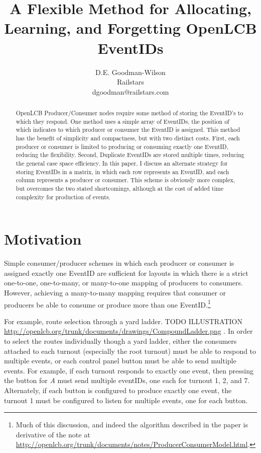 \documentclass[11pt]{article}
\title{A Flexible Method for Allocating, Learning, and Forgetting OpenLCB EventIDs}
\author{D.E. Goodman-Wilson\\Railstars\\dgoodman@railstars.com}
\begin{document}
\maketitle
\begin{abstract}
OpenLCB Producer/Consumer nodes require some method of storing the EventID's to which they respond. One method uses a simple array of EventIDs, the position of which indicates to which producer or consumer the EventID is assigned. This method has the benefit of simplicity and compactness, but with two distinct costs. First, each producer or consumer is limited to producing or consuming exactly one EventID, reducing the flexibility. Second, Duplicate EventIDs are stored multiple times, reducing the general case space efficiency. In this paper, I discuss an alternate strategy for storing EventIDs in a matrix, in which each row represents an EventID, and each column represents a producer or consumer. This scheme is obviously more complex, but overcomes the two stated shortcomings, although at the cost of added time complexity for production of events.
\end{abstract}

\tableofcontents

\section{Motivation}

Simple consumer/producer schemes in which each producer or consumer is assigned exactly one EventID are sufficient for layouts in which there is a strict one-to-one, one-to-many, or many-to-one mapping of producers to consumers. However, achieving a many-to-many mapping requires that consumer or producers be able to consume or produce more than one EventID.\footnote{Much of this discussion, and indeed the algorithm described in the paper is derivative of the note at \url{http://openlcb.org/trunk/documents/notes/ProducerConsumerModel.html}.}

For example, route selection through a yard ladder. TODO ILLUSTRATION \url{http://openlcb.org/trunk/documents/drawings/CompoundLadder.png} . In order to select the routes individually though a yard ladder, either the consumers attached to each turnout (especially the root turnout) must be able to respond to multiple events, or each control panel button must be able to send multiple events. For example, if each turnout responds to exactly one event, then pressing the button for \textit{A} must send multiple eventIDs, one each for turnout 1, 2, and 7. Alternately, if each button is configured to produce exactly one event, the turnout 1 must be configured to listen for multiple events, one for each button.
\end{document}
